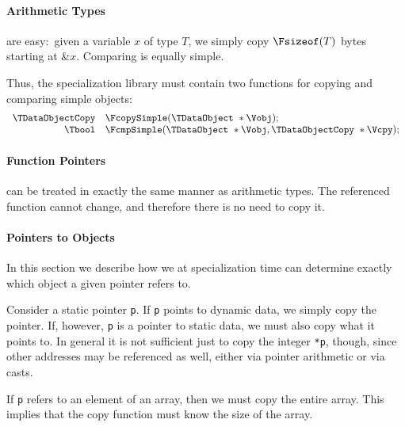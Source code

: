 \begin{docpart}
\paragraph{Arithmetic Types}\label{sec:SLFArithmeticTypes}
 are easy:~given a variable $x$ of type $T$,
we simply copy $\Fsizeof(T)$ bytes starting at $\&x$. 
Comparing is equally simple. 

Thus, the specialization library must contain two functions for
copying and comparing simple objects:
\[
\begin{array}{rl}
\TDataObjectCopy & \FcopySimple(\TDataObject\ *\Vobj); \\
\Tbool & \FcmpSimple(\TDataObject\ *\Vobj, \TDataObjectCopy\ *\Vcpy); 
\end{array}
\]

\paragraph{Function
  Pointers}\label{sec:SLFFunctionPointers}
can be treated in exactly the same manner as arithmetic types. The
referenced function cannot change, and therefore there is no need to copy
it.

\paragraph{Pointers to Objects}
\label{sec:PointersToObjects}

In this section we describe how we at specialization time can
determine exactly which object a given pointer refers to.

Consider a static pointer \texttt{p}. If \texttt{p} points to dynamic
data, we simply copy the pointer. If, however, \texttt{p} is a pointer
to static data, we must also copy what it points to. In general it is
not sufficient just to copy the integer \texttt{*p}, though, since
other addresses may be referenced as well, either via pointer
arithmetic or via casts.

If \texttt{p} refers to an element of an array, then we must copy the
entire array. This implies that the copy function must know the size
of the array.


\end{docpart}
